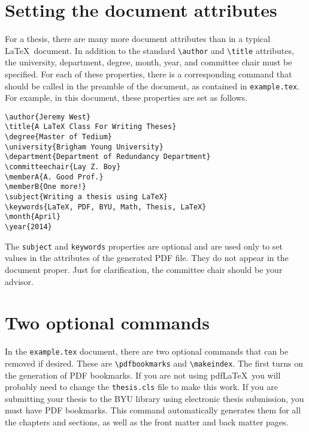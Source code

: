 \documentclass[12pt]{thesis}
\begin{document}
\section{Setting the document attributes}\label{sec:document-attributes}
For a thesis, there are many more document attributes than in a typical \LaTeX\ document. In addition to the standard \verb=\author= and \verb=\title= attributes, the university, department, degree, month, year, and committee chair must be specified. For each of these properties, there is a corresponding command that should be called in the preamble of the document, as contained in \texttt{example.tex}. For example, in this document, these properties are set as follows.
\begin{verbatim}
\author{Jeremy West}
\title{A LaTeX Class For Writing Theses}
\degree{Master of Tedium}
\university{Brigham Young University}
\department{Department of Redundancy Department}
\committeechair{Lay Z. Boy}
\memberA{A. Good Prof.}
\memberB{One more!}
\subject{Writing a thesis using LaTeX}
\keywords{LaTeX, PDF, BYU, Math, Thesis, LaTeX}
\month{April}
\year{2014}
\end{verbatim}
The \texttt{subject} and \texttt{keywords} properties are optional and are used only to set values in the attributes of the generated PDF file. They do not appear in the document proper. Just for clarification, the committee chair should be your advisor.

\section{Two optional commands}
In the \texttt{example.tex} document, there are two optional commands that can be removed if desired. These are \verb=\pdfbookmarks= and \verb=\makeindex=. The first turns on the generation of PDF bookmarks. If you are not using pdf\LaTeX\ you will probably need to change the \texttt{thesis.cls} file to make this work. If you are submitting your thesis to the BYU library using electronic thesis submission, you must have PDF bookmarks. This command automatically generates them for all the chapters and sections, as well as the front matter and back matter pages.
\end{document}
